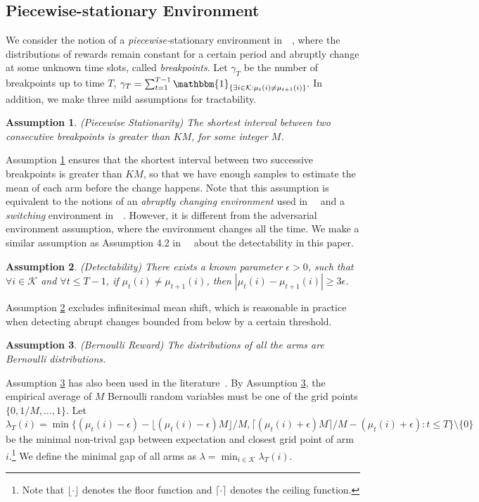 \documentclass[letterpaper]{article}
\newtheorem{assumption}{Assumption}
\begin{document}
\subsection{Piecewise-stationary Environment}
We consider the notion of a \emph{piecewise-}stationary environment in~\citeauthor{yu2009piecewise}~, where the distributions of rewards remain constant for a certain period and abruptly change at some unknown time slots, called \emph{breakpoints}. Let $\gamma_T$ be the number of breakpoints up to time $T$, $\gamma_T=\sum_{t=1}^{T-1}\mathbbm{1}_{\{\exists i\in\mathcal{K}: \mu_t(i)\neq \mu_{t+1}(i)\}}.$
In addition, we make three mild assumptions for tractability.
\begin{assumption}\label{ass:piecewise}
\emph{(Piecewise Stationarity)} The shortest interval between two consecutive breakpoints is greater than $K M$, for some integer $M$.
\end{assumption}
Assumption \ref{ass:piecewise} ensures that the shortest interval between two successive breakpoints is greater than $K M$, so that we have enough samples to estimate the mean of each arm before the change happens. Note that this assumption is equivalent to the notions of an \emph{abruptly changing environment} used in~\citeauthor{garivier2008upper}~ and a \emph{switching} environment in~\citeauthor{mellor2013thompson}~. However, it is different from the adversarial environment assumption, where the environment changes all the time.
We make a similar assumption as Assumption 4.2 in~\citeauthor{yu2009piecewise}~ about the detectability in this paper.
\begin{assumption}\label{ass:detectability}
\emph{(Detectability)} There exists a known parameter $\epsilon>0$, such that $\forall i\in\mathcal{K}$ and $\forall t\leq T-1$, if $\mu_t(i)\neq\mu_{t+1}(i)$, then $|\mu_t(i)-\mu_{t+1}(i)|\geq 3\epsilon$.
\end{assumption}
Assumption \ref{ass:detectability} excludes infinitesimal mean shift, which is reasonable in practice when detecting abrupt changes bounded from below by a certain threshold.

\begin{assumption}\label{ass:lambda}
\emph{(Bernoulli Reward)} The distributions of all the arms are Bernoulli distributions.
\end{assumption}
Assumption \ref{ass:lambda} has also been used in the literature~\cite{besbes2014stochastic,mellor2013thompson,kaufmann2012thompson,agrawal2012analysis}. By Assumption \ref{ass:lambda}, the empirical average of $M$ Bernoulli random variables must be one of the grid points $\{0,1/M,\ldots,1\}$. Let $\lambda_T(i)=\min\{(\mu_t(i)-\epsilon)-{\lfloor (\mu_t(i)-\epsilon)M\rfloor}/{M}, {\lceil (\mu_t(i)+\epsilon)M\rceil}/{M}-(\mu_t(i)+\epsilon): t \leq T\}\setminus\{0\}$ be the minimal non-trival gap between expectation and closest grid point of arm $i$.\footnote{Note that $\lfloor\cdot\rfloor$ denotes the floor function and $\lceil\cdot\rceil$ denotes the ceiling function.} We define the minimal gap of all arms as $\lambda=\min_{i\in\mathcal{K}}\lambda_T(i)$.
\end{document}
